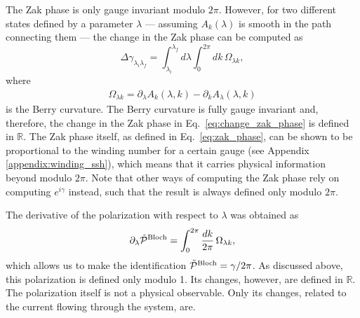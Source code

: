\documentclass[twocolumn,amsmath,longbibliography,amssymb,superscriptaddress]{revtex4-1}
\begin{document}
The Zak phase is only gauge invariant modulo $2\pi$. However, for two different states defined by a parameter $\lambda$ --- assuming $A_k(\lambda)$ is smooth in the path connecting them --- the change in the Zak phase can be computed as
\begin{equation}
\Delta {\gamma_{\lambda_i \lambda_f}} = \int_{\lambda_i}^{\lambda_f} d\lambda\int_{0}^{2\pi} dk \, \Omega_{\lambda k},
\label{eq:change_zak_phase}
\end{equation}
where 
\begin{align}\label{eq:BerryCurvature}
\Omega_{\lambda k} = \partial_\lambda A_k(\lambda,k) - \partial_k A_\lambda(\lambda,k)
\end{align}
 is the Berry curvature. The Berry curvature is fully gauge invariant and, therefore, the change in the Zak phase in Eq.~\eqref{eq:change_zak_phase} is defined in $\mathbb{R}$. %
The Zak phase itself, as defined in Eq.~\eqref{eq:zak_phase}, can be shown to be proportional to the winding number for a certain gauge (see Appendix \ref{appendix:winding_ssh}), which means that it carries physical information beyond modulo $2\pi$. Note that other ways of computing the Zak phase rely on computing $e^{i\gamma}$ instead, such that the result is always defined only modulo $2\pi$.

The derivative of the polarization with respect to $\lambda$ was obtained \cite{KingSmith1993} as
\begin{equation}\label{eq:Bloch_polarization}
\partial_\lambda \tilde{\mathcal{P}}^{\rm Bloch} = \int_{0}^{2\pi} \frac{dk}{2\pi} \, \Omega_{\lambda k},
\end{equation}
which allows us to make the identification $ \tilde{\mathcal{P}}^{\rm Bloch} = \gamma/2\pi$. 
As discussed above,  this polarization is defined only modulo 1.
Its changes, however, are defined in $\mathbb{R}$. The polarization itself is not a physical observable. Only its changes, related to the current flowing through the system, are.
\end{document}
